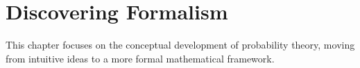 \chapter{Discovering Formalism}

This chapter focuses on the conceptual development of probability theory, moving from intuitive ideas to a more formal mathematical framework.

